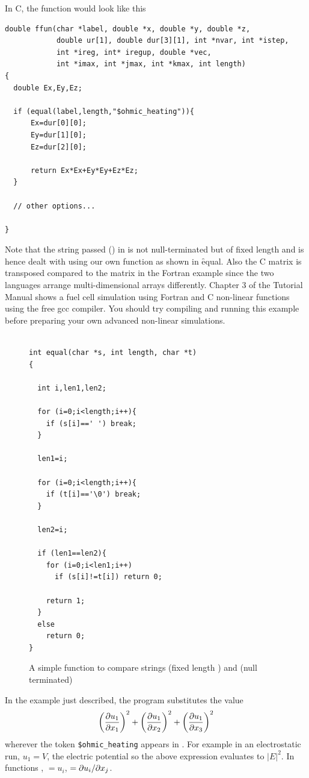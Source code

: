 \documentclass[a4paper,twoside,11pt]{book}
\begin{document}
In C, the function  would look like this
\begin{verbatim}
double ffun(char *label, double *x, double *y, double *z, 
            double ur[1], double dur[3][1], int *nvar, int *istep, 
            int *ireg, int* iregup, double *vec, 
            int *imax, int *jmax, int *kmax, int length)
{
  double Ex,Ey,Ez;

  if (equal(label,length,"$ohmic_heating")){
      Ex=dur[0][0];
      Ey=dur[1][0];
      Ez=dur[2][0];

      return Ex*Ex+Ey*Ey+Ez*Ez;
  }

  // other options...
  
}
\end{verbatim}
Note that the string passed () in is not null-terminated
but of fixed length  and is hence dealt with using our own
 function as shown in \f{equal}. Also the C 
matrix is transposed compared to the matrix in the Fortran example
since the two languages arrange multi-dimensional arrays
differently. Chapter 3 of the Tutorial Manual shows a fuel cell
simulation using Fortran and C non-linear functions using the free gcc
compiler. You should try compiling and running this example before
preparing your own advanced non-linear simulations.

\begin{figure}
\begin{verbatim}
  
int equal(char *s, int length, char *t)
{

  int i,len1,len2;

  for (i=0;i<length;i++){
    if (s[i]==' ') break;
  }

  len1=i;

  for (i=0;i<length;i++){
    if (t[i]=='\0') break;
  }

  len2=i;

  if (len1==len2){
    for (i=0;i<len1;i++)
      if (s[i]!=t[i]) return 0;
      
    return 1;
  }
  else
    return 0;
}
\end{verbatim}
\caption{A simple function to compare strings  (fixed length
  ) and  (null terminated)}
\label{equal}  
\end{figure}

In the example just described, the program substitutes the value
\begin{equation}
  \left(\frac{\partial u_1}{\partial x_1}\right)^2+
\left(\frac{\partial u_1}{\partial x_2}\right)^2+
\left(\frac{\partial u_1}{\partial x_3}\right)^2
\end{equation}
wherever the token \verb+$ohmic_heating+ appears in
. For example in an electrostatic run, $u_1=V$, the
electric potential so the above expression evaluates to $|E|^2$.  In
functions , $=u_i$,
$=\partial u_i/\partial x_j$.
\end{document}
